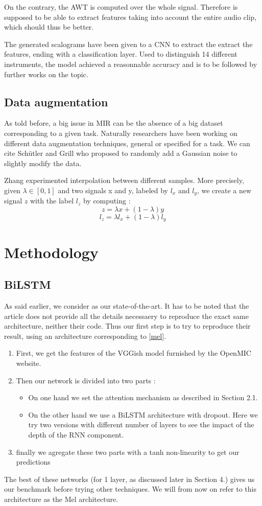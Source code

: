 \documentclass[final]{cvpr}
\begin{document}
On the contrary, the AWT is computed over the whole signal. Therefore is supposed to be able to extract features taking into account the entire audio clip, which should thus be better.

The generated scalograms have been given to a CNN to extract the extract the features, ending with a classification layer. Used to distinguish 14 different instruments, the model achieved a reasonnable accuracy and is to be followed by further works on the topic.
\subsection{Data augmentation}
As told before, a big issue in MIR can be the absence of a big dataset corresponding to a given task. Naturally researchers have been working on different data augmentation techniques, general or specified for a task. We can cite Schütler and Grill \cite{data_aug} who proposed to randomly add a Gaussian noise to slightly modify the data. 

Zhang \etal \cite{interpol} experimented interpolation between different samples. More precisely, given $\lambda\in[0,1]$ and two signals x and y, labeled by $l_x$ and $l_y$, we create a new signal $z$ with the label $l_z$ by computing :
\[z = \lambda x+(1-\lambda)y\]
\[l_z = \lambda l_x+(1-\lambda)l_y\]
\section{Methodology}
\subsection{BiLSTM}
As said earlier, we consider \cite{squelette_progr} as our state-of-the-art. It has to be noted that the article does not provide all the details necessaery to reproduce the exact same architecture, neither their code. Thus our first step is to try to reproduce their result, using an architecture corresponding to \ref{mel}.
\begin{enumerate}
	\item First, we get the features of the VGGish model furnished by the OpenMIC website.
	\item Then our network is divided into two parts :
	\begin{itemize}
		\item On one hand we set the attention mechanism as described in Section 2.1.
		\item On the other hand we use a BiLSTM architecture with dropout. Here we try two versions with different number of layers to see the impact of the depth of the RNN component.
	\end{itemize}
	\item finally we agregate these two parts with a tanh non-linearity to get our predictions
\end{enumerate}
The best of these networks (for 1 layer, as discussed later in Section 4.) gives us our benchmark before trying other techniques. We will from now on refer to this architecture as the Mel architecture.
\end{document}
